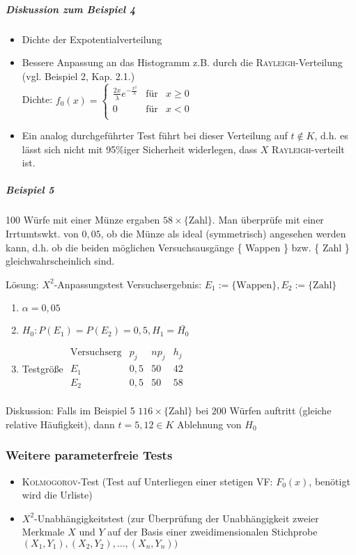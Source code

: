 \documentclass[a4paper]{scrartcl}
\begin{document}
\subparagraph{Diskussion zum Beispiel 4}
\begin{itemize}
\item Dichte der Expotentialverteilung
\item Bessere Anpassung an das Histogramm z.B. durch die \textsc{Rayleigh}-Verteilung (vgl. Beispiel 2, Kap. 2.1.)\\
Dichte: $f_0(x) = \left \{ \begin{array}{lcr} \frac{2x}{\lambda} e^{-\frac{x^2}{\lambda}} &\text{für} & x \geq 0 \\
0 & \text{für} & x <0 \\ \end{array}\right. $
\item Ein analog durchgeführter Test führt bei dieser Verteilung auf $t \notin K$, d.h. es lässt sich nicht mit 95\%iger Sicherheit widerlegen, dass $X$ \textsc{Rayleigh}-verteilt ist.
\end{itemize}

\subparagraph{Beispiel 5} 100 Würfe mit einer Münze ergaben $58 \times \{ \text{Zahl} \}$. Man überprüfe mit einer Irrtumtswkt. von $0,05$, ob die Münze als ideal (symmetrisch) angesehen werden kann, d.h. ob die beiden möglichen Versuchsausgänge \{ Wappen \} bzw. \{ Zahl \} gleichwahrscheinlich sind.

Lösung: $X^2$-Anpassungstest Versuchsergebnis: $E_1 := \{ \text{Wappen} \} , E_2 := \{ \text{Zahl} \}$
\begin{enumerate}
\item $\alpha = 0,05$
\item $H_0 : P(E_1) = P(E_2) = 0,5 , H_1 = \bar{H_0}$
\item Testgröße $\begin{array}{l|c|c|r} \text{Versuchserg} & p_j & np_j & h_j \\ \hline
E_1 & 0,5 & 50 & 42 \\
E_2 & 0,5 & 50 & 58 \\
\end{array}$
\end{enumerate}

Diskussion: Falls im Beispiel 5 $116 \times \{ \text{Zahl}\}$ bei $200$ Würfen auftritt (gleiche relative Häufigkeit), dann $t=5,12 \in K$ Ablehnung von $H_0$

\subsubsection{Weitere parameterfreie Tests}
\begin{itemize}
\item \textsc{Kolmogorov}-Test (Test auf Unterliegen einer stetigen VF: $F_0 (x)$, benötigt wird die Urliste)
\item $X^2$-Unabhängigkeitstest (zur Überprüfung der Unabhängigkeit zweier Merkmale $X$ und $Y$ auf der Basis einer zweidimensionalen Stichprobe $(X_1,Y_1),(X_2,Y_2),\dots,(X_n,Y_n))$
\end{itemize}
\end{document}
